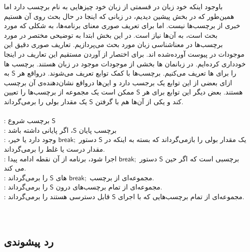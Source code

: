 با‌وجود اینکه خود زبان  در قسمتی از زبان خود چیز‌هایی به نام برچسب دارد اما همین‌طور که در بخش پیشین دیدیم، در زبانی که اینجا در حال بحث روی آن هستیم خبری از برچسب‌ها نیست. اما برای تعریف صوری معنای برنامه‌ها، به شکلی که مورد بحث است، به آن‌ها نیاز است. در این بخش ابتدا به توضیحی مختصر در مورد برچسب‌ها در معناشناسی‌ زبان مورد بحث می‌پردازیم. تعاریف صوری دقیق این موجودات در پیوست \cite{calcul} آورده‌شده اند. برای اختصار از آوردن مستقیم این تعاریف در اینجا خود‌داری کرده‌ایم. 
در زبانمان ها بخشی از موجودات موجود در زبان هستند. برچسب ها را برای ها تعریف می‌کنیم. برچسب‌ها با کمک توابع  تعریف می‌شوند. در‌واقع هر $\mathsf{S}$ به ازای بعضی از این توابع یک برجسب دارد و این‌ها در‌واقع نشان‌دهنده‌ی آن برچسب هستند. بعض دیگر این توابع برای هر $\mathsf{S}$ ممکن است یک مجموعه از برچسب‌ها را تعیین‌ کند و یکی از آن‌ها هم با گرفتن $\mathsf{S}$ یک مقدار بولی را بر‌می‌گرداند. 
\\\\
 : برچسب شروع $\mathsf{S}$\\
 : برچسب پایان $\mathsf{S}$، اگر پایانی داشته باشد\\
 : یک مقدار بولی را باز‌‌می‌گرداند که بسته به اینکه در $\mathsf{S}$ دستور $\mathsf{break;}$ وجود دارد یا خیر، مقدار درست یا غلط را بر‌می‌گرداند.\\
 : برچسبی است که اگر حین $\mathsf{S}$ دستور $\mathsf{break;}$ اجرا شود، برنامه از آن نقطه ادامه پیدا می کند.\\
 : مجموعه‌ای از برچسب $\mathsf{break;}$ های $\mathsf{S}$ را بر‌می‌گرداند.\\
 : مجموعه‌ای از تمام برچسب‌های درون $\mathsf{S}$ را برمی‌گرداند.\\
 : مجموعه‌ای از تمام بر‌چسب‌هایی که با اجرای $\mathsf{S}$ قابل دسترسی هستند را بر‌می‌گرداند.\\\\\\


\subsection{رد پیشوندی}


